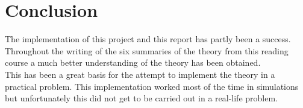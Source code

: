 
\section{Conclusion} %
\label{sec:conclusion}

The implementation of this project and this report has partly been a success.\\

Throughout the writing of the six summaries of the theory from this reading course a much better understanding of the theory has been obtained.\\

This has been a great basis for the attempt to implement the theory in a practical problem. This implementation worked most of the time in simulations but unfortunately this did not get to be carried out in a real-life problem.
